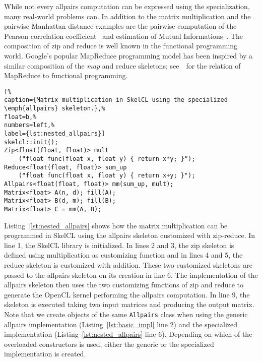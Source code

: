 While not every allpairs computation can be expressed using the specialization, many real-world problems can.
In addition to the matrix multiplication and the pairwise Manhattan distance examples are the pairwise computation of the Pearson correlation coefficient~\cite{DaDQR-09} and estimation of Mutual Informations~\cite{DaSSK-04}.
The composition of zip and reduce is well known in the functional programming world.
Google's popular MapReduce programming model has been inspired by a similar composition of the \emph{map} and reduce skeletons; see~\cite{La-07}~for the relation of MapReduce to functional programming.

\begin{lstlisting}[%                                                             
caption={Matrix multiplication in SkelCL using the specialized \emph{allpairs} skeleton.},%
float=b,%                                                                       
numbers=left,%
label={lst:nested_allpairs}]
skelcl::init();
Zip<float(float, float)> mult
    ("float func(float x, float y) { return x*y; }");
Reduce<float(float, float)> sum_up
    ("float func(float x, float y) { return x+y; }");
Allpairs<float(float, float)> mm(sum_up, mult);
Matrix<float> A(n, d); fill(A);
Matrix<float> B(d, m); fill(B);
Matrix<float> C = mm(A, B);
\end{lstlisting}

Listing~\ref{lst:nested_allpairs} shows how the matrix multiplication can be programmed in SkelCL using the allpairs skeleton customized with zip-reduce.
In line 1, the SkelCL library is initialized.
In lines 2 and 3, the zip skeleton is defined using multiplication as customizing function and in lines 4 and 5, the reduce skeleton is customized with addition.
These two customized skeletons are passed to the allpairs skeleton on its creation in line 6.
The implementation of the allpairs skeleton then uses the two customizing functions of zip and reduce to generate the OpenCL kernel performing the allpairs computation.
In line 9, the skeleton is executed taking two input matrices and producing the output matrix.
Note that we create objects of the same \texttt{Allpairs} class when using the generic allpairs implementation (Listing~\ref{lst:basic_impl} line 2) and the specialized implementation (Listing~\ref{lst:nested_allpairs} line 6).
Depending on which of the overloaded constructors is used, either the generic or the specialized implementation is created.

